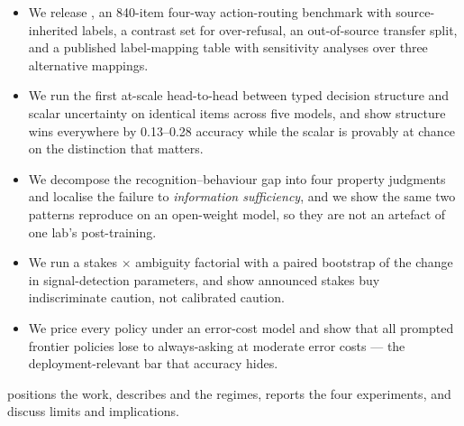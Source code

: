 \begin{itemize}[leftmargin=*,itemsep=1pt,topsep=2pt]
    \item We release \carb, an 840-item four-way action-routing benchmark with source-inherited
    labels, a contrast set for over-refusal, an out-of-source transfer split, and a published
    label-mapping table with sensitivity analyses over three alternative mappings.
    \item We run the first at-scale head-to-head between typed decision structure and scalar
    uncertainty on identical items across five models, and show structure wins everywhere by
    0.13--0.28 accuracy while the scalar is provably at chance on the distinction that matters.
    \item We decompose the recognition--behaviour gap into four property judgments and localise
    the failure to \emph{information sufficiency}, and we show the same two patterns reproduce on
    an open-weight model, so they are not an artefact of one lab's post-training.
    \item We run a stakes $\times$ ambiguity factorial with a paired bootstrap of the change in
    signal-detection parameters, and show announced stakes buy indiscriminate caution, not
    calibrated caution.
    \item We price every policy under an error-cost model and show that all prompted frontier
    policies lose to always-asking at moderate error costs --- the deployment-relevant bar that
    accuracy hides.
\end{itemize}

 positions the work,  describes \carb and the regimes,
 reports the four experiments, and 
discuss limits and implications.
